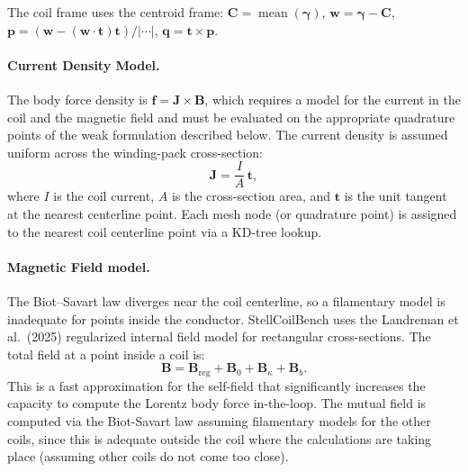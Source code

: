 The coil frame uses the centroid frame: $\mathbf{C} = \operatorname{mean}(\boldsymbol{\gamma})$, $\mathbf{w} = \boldsymbol{\gamma} - \mathbf{C}$, $\mathbf{p} = (\mathbf{w} - (\mathbf{w} \cdot \mathbf{t})\mathbf{t}) / |\cdots|$, $\mathbf{q} = \mathbf{t} \times \mathbf{p}$.

\paragraph{Current Density Model.}
The body force density is $\bm f = \bm J \times \bm B$, which requires a model for the current in the coil and the magnetic field and must be evaluated on the appropriate quadrature points of the weak formulation described below.
The current density is assumed uniform across the winding-pack cross-section:
\begin{equation}
  \mathbf{J} = \frac{I}{A} \, \mathbf{t},
\end{equation}
where $I$ is the coil current, $A$ is the cross-section area, and $\mathbf{t}$ is the unit tangent at the nearest centerline point. Each mesh node (or quadrature point) is assigned to the nearest coil centerline point via a KD-tree lookup.

\paragraph{Magnetic Field model.}
The Biot--Savart law diverges near the coil centerline, so a filamentary model is inadequate for points inside the conductor. StellCoilBench uses the Landreman et al.\ (2025) regularized internal field model for rectangular cross-sections. The total field at a point inside a coil is:
\begin{equation}
  \mathbf{B} = \mathbf{B}_{\text{reg}} + \mathbf{B}_0 + \mathbf{B}_{\kappa} + \mathbf{B}_b.
\end{equation}
This is a fast approximation for the self-field that significantly increases the capacity to compute the Lorentz body force in-the-loop.
The mutual field is computed via the Biot-Savart law assuming filamentary models for the other coils, since this is adequate outside the coil where the calculations are taking place (assuming other coils do not come too close).

